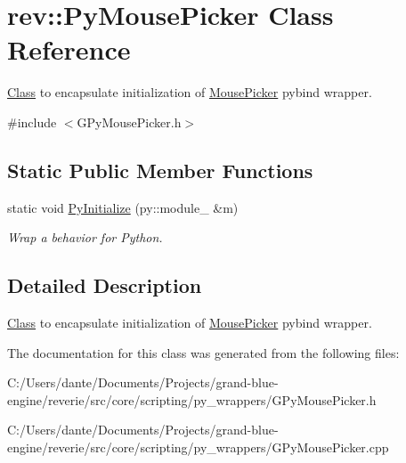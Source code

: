 \hypertarget{classrev_1_1_py_mouse_picker}{}\section{rev\+::Py\+Mouse\+Picker Class Reference}
\label{classrev_1_1_py_mouse_picker}


\mbox{\hyperlink{struct_class}{Class}} to encapsulate initialization of \mbox{\hyperlink{classrev_1_1_mouse_picker}{Mouse\+Picker}} pybind wrapper.  




{\ttfamily \#include $<$G\+Py\+Mouse\+Picker.\+h$>$}

\subsection*{Static Public Member Functions}
\begin{DoxyCompactItemize}
\item 
\mbox{\label{classrev_1_1_py_mouse_picker_a39a8095a82b97ca95f901185ebc44f01}} 
static void \mbox{\hyperlink{classrev_1_1_py_mouse_picker_a39a8095a82b97ca95f901185ebc44f01}{Py\+Initialize}} (py\+::module\+\_\+ \&m)
\begin{DoxyCompactList}\small\item\em Wrap a behavior for Python. \end{DoxyCompactList}\end{DoxyCompactItemize}


\subsection{Detailed Description}
\mbox{\hyperlink{struct_class}{Class}} to encapsulate initialization of \mbox{\hyperlink{classrev_1_1_mouse_picker}{Mouse\+Picker}} pybind wrapper. 

The documentation for this class was generated from the following files\+:\begin{DoxyCompactItemize}
\item 
C\+:/\+Users/dante/\+Documents/\+Projects/grand-\/blue-\/engine/reverie/src/core/scripting/py\+\_\+wrappers/G\+Py\+Mouse\+Picker.\+h\item 
C\+:/\+Users/dante/\+Documents/\+Projects/grand-\/blue-\/engine/reverie/src/core/scripting/py\+\_\+wrappers/G\+Py\+Mouse\+Picker.\+cpp\end{DoxyCompactItemize}
